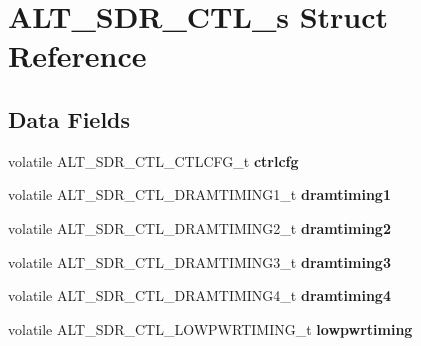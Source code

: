\hypertarget{structALT__SDR__CTL__s}{}\section{A\+L\+T\+\_\+\+S\+D\+R\+\_\+\+C\+T\+L\+\_\+s Struct Reference}
\label{structALT__SDR__CTL__s}
\subsection*{Data Fields}
\begin{DoxyCompactItemize}
\item 
\mbox{\label{structALT__SDR__CTL__s_a85e0d0a66d117659a65d3edd379b3992}} 
volatile A\+L\+T\+\_\+\+S\+D\+R\+\_\+\+C\+T\+L\+\_\+\+C\+T\+L\+C\+F\+G\+\_\+t {\bfseries ctrlcfg}
\item 
\mbox{\label{structALT__SDR__CTL__s_a11a88988056b94ad42598cd1867653ed}} 
volatile A\+L\+T\+\_\+\+S\+D\+R\+\_\+\+C\+T\+L\+\_\+\+D\+R\+A\+M\+T\+I\+M\+I\+N\+G1\+\_\+t {\bfseries dramtiming1}
\item 
\mbox{\label{structALT__SDR__CTL__s_a5e9518327867a2a664bf9c580dc2782f}} 
volatile A\+L\+T\+\_\+\+S\+D\+R\+\_\+\+C\+T\+L\+\_\+\+D\+R\+A\+M\+T\+I\+M\+I\+N\+G2\+\_\+t {\bfseries dramtiming2}
\item 
\mbox{\label{structALT__SDR__CTL__s_a85521f06356956aeac84e249376795d3}} 
volatile A\+L\+T\+\_\+\+S\+D\+R\+\_\+\+C\+T\+L\+\_\+\+D\+R\+A\+M\+T\+I\+M\+I\+N\+G3\+\_\+t {\bfseries dramtiming3}
\item 
\mbox{\label{structALT__SDR__CTL__s_a834c6bc4d0b29268756ceefaa34f63f4}} 
volatile A\+L\+T\+\_\+\+S\+D\+R\+\_\+\+C\+T\+L\+\_\+\+D\+R\+A\+M\+T\+I\+M\+I\+N\+G4\+\_\+t {\bfseries dramtiming4}
\item 
\mbox{\label{structALT__SDR__CTL__s_a55999a2cdd2425bc19c12c9f30c0d68f}} 
volatile A\+L\+T\+\_\+\+S\+D\+R\+\_\+\+C\+T\+L\+\_\+\+L\+O\+W\+P\+W\+R\+T\+I\+M\+I\+N\+G\+\_\+t {\bfseries lowpwrtiming}
\item 
\mbox{\label{structALT__SDR__CTL__s_a896d01b3241fe6aec168938a2206d71c}} 

\end{DoxyCompactItemize}
